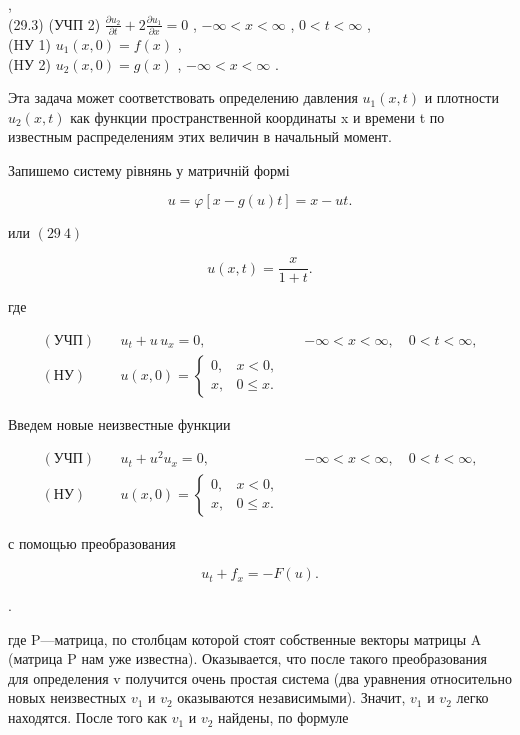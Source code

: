 \documentclass[
  ukrainian,
]{article}
\begin{document}
,\\
(29.3) (УЧП 2)
\(\frac{\partial u_2}{\partial t} + 2 \frac{\partial u_1}{\partial x} = 0\)
, \(-\infty < x < \infty\) , \(0 < t < \infty\) ,\\
(HУ 1) \(u_1(x, 0) = f(x)\) ,\\
(HУ 2) \(u_2(x, 0) = g(x)\) , \(-\infty < x < \infty\) .

Эта задача может соответствовать определению давления \(u_1(x, t)\) и
плотности \(u_2(x, t)\) как функции пространственной координаты x и
времени t по известным распределениям этих величин в начальный момент.

Запишемо систему рівнянь у матричній формі

\[
u=\varphi[x-g(u)t]=x-ut.
\]

или \((29 \ 4)\)

\[
u(x,t)=\frac{x}{1+t}.
\]

где

\[
\begin{aligned}
(\text{УЧП})\quad & u_t + u\,u_x = 0, && -\infty < x < \infty,\quad 0 < t < \infty, \\
(\text{НУ})\quad &
u(x,0)=
\begin{cases}
0, & x < 0,\\
x, & 0 \le x.
\end{cases}
\end{aligned}
\]

Введем новые неизвестные функции

\[
\begin{aligned}
(\text{УЧП})\quad & u_t + u^2 u_x = 0, && -\infty < x < \infty,\quad 0 < t < \infty, \\
(\text{НУ})\quad &
u(x,0)=
\begin{cases}
0, & x < 0,\\
x, & 0 \le x.
\end{cases}
\end{aligned}
\]

с помощью преобразования

\[
u_t + f_x = -F(u).
\]

.

где P---матрица, по столбцам которой стоят собственные векторы матрицы A
(матрица P нам уже известна). Оказывается, что после такого
преобразования для определения v получится очень простая система (два
уравнения относительно новых неизвестных \(v_1\) и \(v_2\) оказываются
независимыми). Значит, \(v_1\) и \(v_2\) легко находятся. После того как
\(v_1\) и \(v_2\) найдены, по формуле
\end{document}
